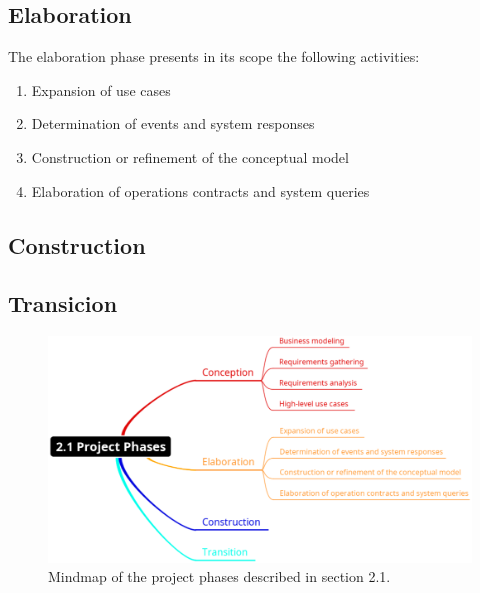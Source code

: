 \documentclass[11pt, twoside, a4paper]{book}
\begin{document}
				\subsection{Elaboration}
				
					The elaboration phase presents in its scope the following activities:
					
					\begin{enumerate}
						\item Expansion of use cases								
						\item Determination of events and system responses
						\item Construction or refinement of the conceptual model
						\item Elaboration of operations contracts and system queries
					\end{enumerate}
					
				\subsection{Construction}
										
				\subsection{Transicion}

				\begin{figure}[!ht]
					\centering
  					\includegraphics[scale=0.4]{2-1_Project_Phases.eps}
					\caption{Mindmap of the project phases described in section 2.1.}
				\end{figure}
\end{document}
